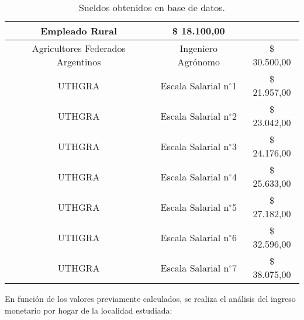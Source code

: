 \begin{table}[H]
\begin{tabular}{|c|c|c|}
      Empleado Rural &
      \$ 18.100,00
      \bigstrut\\
    \hline
    Agricultores Federados Argentinos &
      Ingeniero Agrónomo &
      \$ 30.500,00
      \bigstrut\\
    \hline
    UTHGRA &
      Escala Salarial n$^{\circ}$1 &
      \$ 21.957,00
      \bigstrut\\
    \hline
    UTHGRA &
      Escala Salarial n$^{\circ}$2 &
      \$ 23.042,00
      \bigstrut\\
    \hline
    UTHGRA &
      Escala Salarial n$^{\circ}$3 &
      \$ 24.176,00
      \bigstrut\\
    \hline
    UTHGRA &
      Escala Salarial n$^{\circ}$4 &
      \$ 25.633,00
      \bigstrut\\
    \hline
    UTHGRA &
      Escala Salarial n$^{\circ}$5 &
      \$ 27.182,00
      \bigstrut\\
    \hline
    UTHGRA &
      Escala Salarial n$^{\circ}$6 &
      \$ 32.596,00
      \bigstrut\\
    \hline
    UTHGRA &
      Escala Salarial n$^{\circ}$7 &
      \$ 38.075,00
      \bigstrut\\
    \hline
    \end{tabular}%
    \caption{Sueldos obtenidos en base de datos.}
  \label{tab:sueldos}%
\end{table}%


















En función de los valores previamente calculados, se realiza el análisis del ingreso monetario por hogar de la localidad estudiada:

